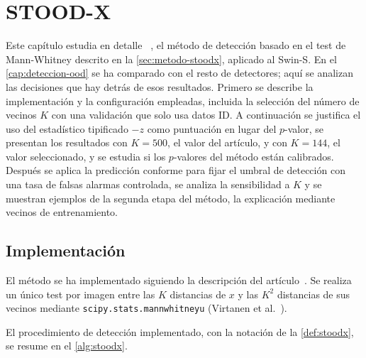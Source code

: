 %

\chapter{STOOD-X}\label{cap:stoodx}

Este capítulo estudia en detalle \stoodx~\cite{sevillano2026}, el método de detección basado en el test de Mann-Whitney descrito en la \cref{sec:metodo-stoodx}, aplicado al Swin-S. En el \cref{cap:deteccion-ood} se ha comparado con el resto de detectores; aquí se analizan las decisiones que hay detrás de esos resultados. Primero se describe la implementación y la configuración empleadas, incluida la selección del número de vecinos $K$ con una validación que solo usa datos ID. A continuación se justifica el uso del estadístico tipificado $-z$ como puntuación en lugar del $p$-valor, se presentan los resultados con $K = 500$, el valor del artículo, y con $K = 144$, el valor seleccionado, y se estudia si los $p$-valores del método están calibrados. Después se aplica la predicción conforme para fijar el umbral de detección con una tasa de falsas alarmas controlada, se analiza la sensibilidad a $K$ y se muestran ejemplos de la segunda etapa del método, la explicación mediante vecinos de entrenamiento.

\section{Implementación}\label{sec:stoodx-implementacion}

El método se ha implementado siguiendo la descripción del artículo~\cite{sevillano2026}. Se realiza un único test por imagen entre las $K$ distancias de $x$ y las $K^2$ distancias de sus vecinos mediante \texttt{scipy.stats.mannwhitneyu} (Virtanen et al.~\cite{virtanen2020}).

El procedimiento de detección implementado, con la notación de la \cref{def:stoodx}, se resume en el \cref{alg:stoodx}.

